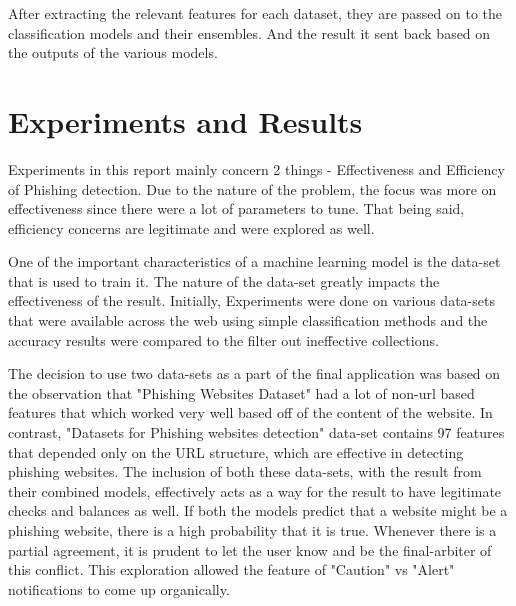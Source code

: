 \documentclass[conference]{IEEEtran}
\begin{document}
\par After extracting the relevant features for each dataset, they are passed on to the classification models and their ensembles.
And the result it sent back based on the outputs of the various models.


\section{Experiments and Results}

Experiments in this report mainly concern 2 things - Effectiveness and Efficiency of Phishing detection. Due to the nature of the problem, the focus was more on effectiveness since there were a lot of parameters to tune. That being said, efficiency concerns are legitimate and were explored as well.

\par One of the important characteristics of a machine learning model is the data-set that is used to train it. The nature of the data-set greatly impacts the effectiveness of the result. Initially, Experiments were done on various data-sets that were available across the web using simple classification methods and the accuracy results were compared to the filter out ineffective collections. 

\par The decision to use two data-sets as a part of the final application was based on the observation that "Phishing Websites Dataset" had a lot of non-url based features that which worked very well based off of the content of the website. In contrast, "Datasets for Phishing websites detection" data-set contains 97 features that depended only on the URL structure, which are effective in detecting phishing websites. The inclusion of both these data-sets, with the result from their combined models, effectively acts as a way for the result to have legitimate checks and balances as well. If both the models predict that a website might be a phishing website, there is a high probability that it is true. Whenever there is a partial agreement, it is prudent to let the user know and be the final-arbiter of this conflict. This exploration allowed the feature of "Caution" vs "Alert" notifications to come up organically.
\end{document}
